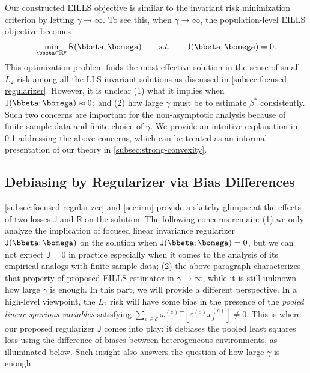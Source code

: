 \documentclass[10pt]{article}
\numberwithin{equation}{section}
\begin{document}
Our constructed EILLS objective is similar to the invariant risk minimization criterion \citep{arjovsky2019invariant} by letting $\gamma \to \infty$. To see this, when $\gamma\to \infty$, the population-level EILLS objective becomes
\begin{align*}
    \min_{\bbeta \in \mathbb{R}^p} \mathsf{R}(\bbeta;\bomega) ~~~~~~s.t.~~~~~~ \mathsf{J}(\bbeta;\bomega)=0.
\end{align*} This optimization problem finds the most effective solution in the sense of small $L_2$ risk among all the LLS-invariant solutions as discussed in \cref{subsec:focused-regularizer}. However, it is unclear (1) what it implies when $\mathsf{J}(\bbeta;\bomega) \approx 0$; and (2) how large $\gamma$ must be to estimate $\beta^*$ consistently. Such two concerns are important for the non-asymptotic analysis because of finite-sample data and finite choice of $\gamma$. We provide an intuitive explanation in \cref{subsubsec:debias} addressing the above concerns, which can be treated as an informal presentation of our theory in \cref{subsec:strong-convexity}.



\subsection{Debiasing by Regularizer via Bias Differences} 
\label{subsubsec:debias} 

\cref{subsec:focused-regularizer} and \cref{sec:irm} provide a sketchy glimpse at the effects of two losses $\mathsf{J}$ and $\mathsf{R}$ on the solution. The following concerns remain: (1) we only analyze the implication of focused linear invariance regularizer $\mathsf{J}(\bbeta;\bomega)$ on the solution when $\mathsf{J}(\bbeta;\bomega)=0$, but we can not expect $\mathsf{J}=0$ in practice especially when it comes to the analysis of its empirical analogs with finite sample data; (2) the above paragraph characterizes that property of proposed EILLS estimator in $\gamma \to \infty$, while it is still unknown how large $\gamma$ is enough. In this part, we will provide a different perspective. In a high-level viewpoint, the $L_2$ risk will have some bias in the presence of the \emph{pooled linear spurious variables} satisfying $\sum_{e\in \mathcal{E}} \omega^{(e)} \mathbb{E} [\varepsilon^{(e)} x_j^{(e)}] \neq 0$. This is where our proposed regularizer $\mathsf{J}$ comes into play: it debiases the pooled least squares loss using the difference of biases between heterogeneous environments, as illuminated below. Such insight also answers the question of how large $\gamma$ is enough.
\end{document}
